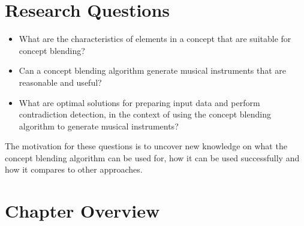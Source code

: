 
\section{Research Questions}
\begin{itemize}
\item What are the characteristics of elements in a concept that are suitable for concept blending?
\item Can a concept blending algorithm generate musical instruments that are reasonable and useful?
\item What are optimal solutions for preparing input data and perform contradiction detection, in the context of using the concept blending algorithm to generate musical instruments?
\end{itemize}
The motivation for these questions is to uncover new knowledge on what the concept blending algorithm can be used for, how it can be used successfully and how it compares to other approaches.



\section{Chapter Overview}

